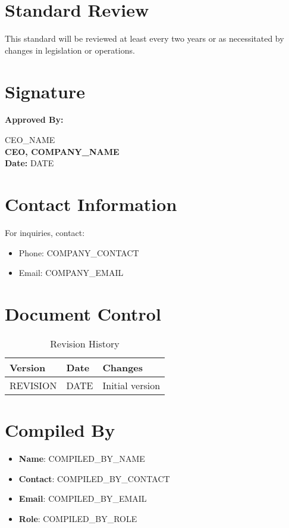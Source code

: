 \documentclass[12pt]{article}
\begin{document}
\section{Standard Review}
This standard will be reviewed at least every two years or as necessitated by changes in legislation or operations.

\section{Signature}
\textbf{Approved By:}

{{CEO_NAME}}\\
\textbf{CEO, {{COMPANY_NAME}}}\\
\textbf{Date:} {{DATE}}

\section{Contact Information}
For inquiries, contact:
\begin{itemize}
    \item Phone: {{COMPANY_CONTACT}}
    \item Email: {{COMPANY_EMAIL}}
\end{itemize}

\section{Document Control}
\begin{table}[h]
    \centering
    \begin{tabular}{p{3cm}p{3cm}p{6cm}}
        \toprule
        \textbf{Version} & \textbf{Date} & \textbf{Changes} \\
        \midrule
        {{REVISION}} & {{DATE}} & Initial version \\
        \bottomrule
    \end{tabular}
    \caption{Revision History}
\end{table}

\section{Compiled By}
\begin{itemize}
    \item \textbf{Name}: {{COMPILED_BY_NAME}}
    \item \textbf{Contact}: {{COMPILED_BY_CONTACT}}
    \item \textbf{Email}: {{COMPILED_BY_EMAIL}}
    \item \textbf{Role}: {{COMPILED_BY_ROLE}}
\end{itemize}
\end{document}
